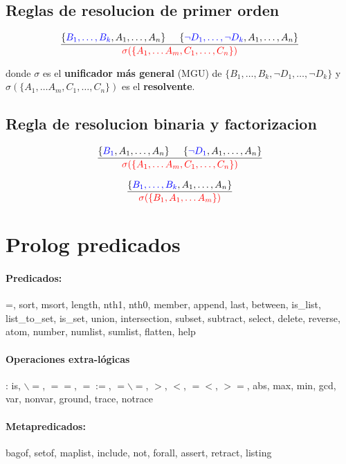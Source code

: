 \documentclass[10pt,a4paper]{article}
\begin{document}
\subsection{Reglas de resolucion de primer orden}
$$\frac{\{\color{blue}B_1,\dots,B_k\color{black},A_1,\dots,A_n\}\hspace*{5mm}\{\color{blue}\lnot D_1,\dots,\lnot D_k\color{black},A_1,\dots,A_n\}}{{\color{red}\sigma(\{A_1,\dots A_m, C_1,\dots,C_n\})}}$$

donde $\sigma$ es el \textbf{unificador más general} (MGU) de $\{B_1,\dots,B_k,\lnot D_1,\dots,\lnot D_k\}$ y \\ $\sigma(\{A_1,\dots A_m, C_1,\dots,C_n\})$ es el \textbf{resolvente}.

\subsection{Regla de resolucion binaria y factorizacion}
$$\frac{\{\color{blue}B_1\color{black},A_1,\dots,A_n\}\hspace*{5mm}\{\color{blue}\lnot D_1\color{black},A_1,\dots,A_n\}}{{\color{red}\sigma(\{A_1,\dots A_m, C_1,\dots,C_n\})}}$$

$$\frac{\{\color{blue}B_1,\dots,B_k\color{black},A_1,\dots,A_n\}}{{\color{red}\sigma(\{B_1,A_1,\dots A_m\})}}$$

\section{Prolog predicados}
\paragraph{Predicados:} 
=, sort, msort, length, nth1, nth0, member, append, last, between, is\_list, list\_to\_set, is\_set, union, intersection, subset, subtract, select, delete, reverse,  atom,  number, numlist, sumlist, flatten, help

\paragraph{Operaciones extra-lógicas}: is, $\backslash =$,  $==$,  $=:=$, $=\backslash=$, $>$, $<$, $=<$, $>=$, abs, max, min, gcd,  var,  nonvar, ground, trace, notrace

\paragraph{Metapredicados:} bagof, setof, maplist, include, not, forall, assert, retract, listing
\end{document}
